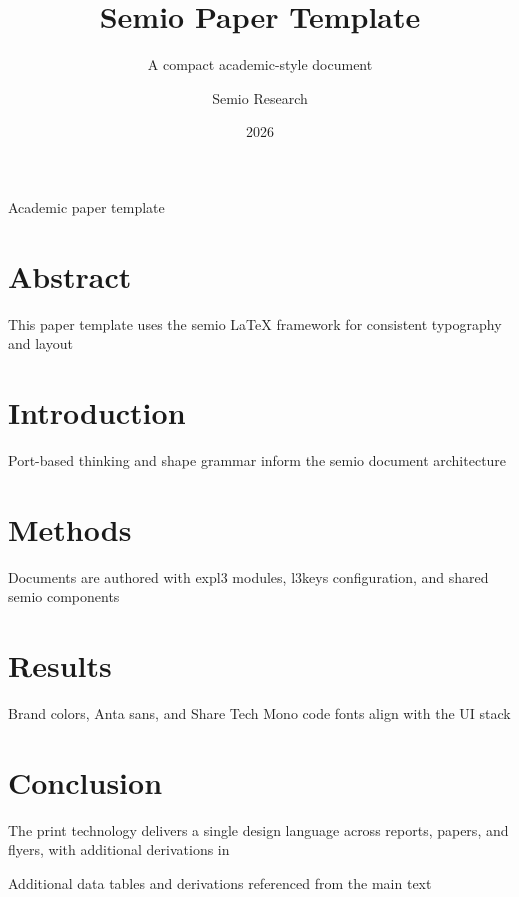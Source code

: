 \title{Semio Paper Template}
\author{Semio Research}
\date{2026}
\subtitle{A compact academic-style document}




\maketitle

\begin{Panel}[anchor=top-right, x=1cm, y=5cm, width=5cm]
  Academic paper template
\end{Panel}

\section{Abstract}
This paper template uses the semio LaTeX framework for consistent typography and layout

\section{Introduction}
Port-based thinking and shape grammar inform the semio document architecture

\section{Methods}
Documents are authored with expl3 modules, l3keys configuration, and shared semio components \cite{latexprint2024}

\section{Results}
Brand colors, Anta sans, and Share Tech Mono code fonts align with the UI stack \cite{portbased2025,shapegrammar2026}

\section{Conclusion}
The print technology delivers a single design language across reports, papers, and flyers, with additional derivations in 

\makeappendices
{}
\label{appendix:supplementary}
Additional data tables and derivations referenced from the main text

\makeregisters


